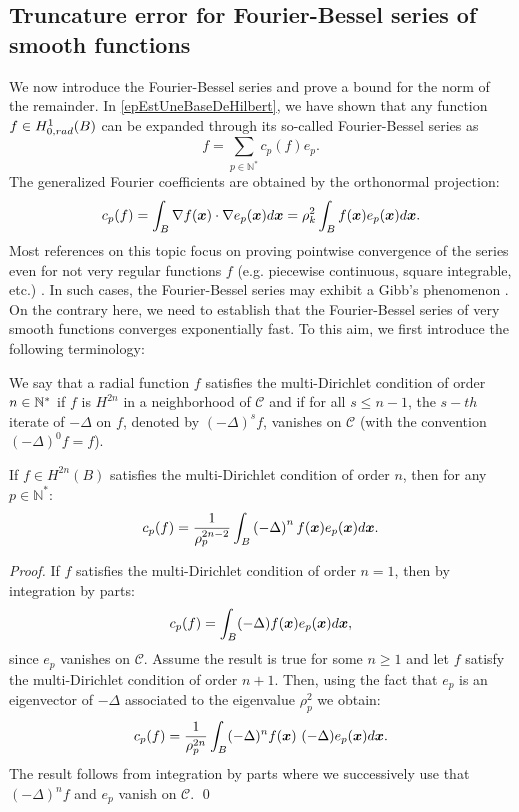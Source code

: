 \documentclass[smallextended]{svjour3}
\begin{document}
\subsection{Truncature error for Fourier-Bessel series of smooth functions}
\label{FourierBesselTruncError}
We now introduce the Fourier-Bessel series and prove a bound for the norm of the remainder. 
In \autoref{epEstUneBaseDeHilbert}, we have shown that any function $f \in H^1_{0,rad}(B)$ can be expanded through its so-called Fourier-Bessel series as
\[f = \sum_{p\in \mathbb{N}^*}c_p(f)e_{p}.\]
The generalized Fourier coefficients are obtained by the orthonormal projection: 
\[c_p(f) = \displaystyle \int_B \nabla f(\boldsymbol{x}) \cdot \nabla e_{p}(\boldsymbol{x}) d\boldsymbol{x} = \rho_k^2 \int_{B}{f(\boldsymbol{x}) e_p(\boldsymbol{x})d\boldsymbol{x}}.\]
Most references on this topic focus on proving pointwise convergence of the series even for not very regular functions $f$ (e.g. piecewise continuous, square integrable, etc.) \cite{stempak2002convergence,guadalupe1993mean,Balodis1999,colzani1993equiconvergence}.  In such cases, the Fourier-Bessel series may exhibit a Gibb's phenomenon \cite{wilton1928gibbs}. On the contrary here, we need to establish that the Fourier-Bessel series of very smooth functions converges exponentially fast. To this aim, we first introduce the following terminology: 
\begin{definition}
	We say that a radial function $f$ satisfies the multi-Dirichlet condition of order $n \in \mathbb{N}^*$ if $f$ is $H^{2n}$ in a neighborhood of $\mathcal{C}$ and if for all $s \leq n-1$, the $s-th$ iterate of $-\Delta$ on $f$, denoted by $(-\Delta)^s f$, vanishes on $\mathcal{C}$ (with the convention $(-\Delta)^0 f = f$). 
\end{definition}
\begin{proposition} 
	\label{DecroissanceFourierBessel}
	If $f \in H^{2n}(B)$ satisfies the multi-Dirichlet condition of order $n$, then for any $p \in \mathbb{N}^*$:
	\[ c_p(f) = \dfrac{1}{\rho_{p}^{2n-2}} \int_{B}\left(-\Delta\right)^{n} f(\boldsymbol{x})e_p(\boldsymbol{x}) d\boldsymbol{x}.\] 
\end{proposition}
\begin{proof}
	If $f$ satisfies the multi-Dirichlet condition of order $n=1$, then by integration by parts:
	\[c_p(f) = \int_{B}(-\Delta)f(\boldsymbol{x}) e_p(\boldsymbol{x})d\boldsymbol{x},\]
	since $e_p$ vanishes on $\mathcal{C}$.
	Assume the result is true for some $n \geq 1$ and let $f$ satisfy the multi-Dirichlet condition of order $n+1$. Then, using the fact that $e_p$ is an eigenvector of $-\Delta$ associated to the eigenvalue $\rho_p^2$ we obtain:
	\[c_p(f) = \frac{1}{\rho_p^{2n}}\int_{B}(-\Delta)^{n}f(\boldsymbol{x})~ (-\Delta) e_p(\boldsymbol{x}) d\boldsymbol{x}.\]
	The result follows from integration by parts where we successively use that $(-\Delta)^{n}f$ and $e_p$ vanish on $\mathcal{C}$.
	\qed
\end{proof}
\end{document}
